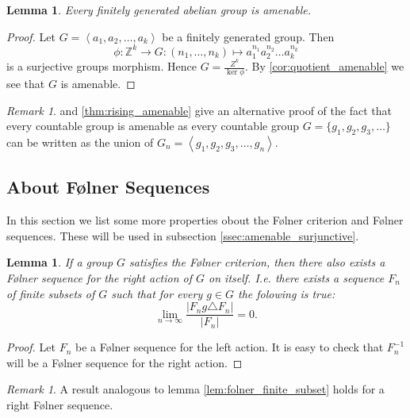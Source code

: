 \documentclass[titlepage, a4paper]{article}
\newcommand{\Z}{\mathbb{Z}}
\newcommand{\card}[1]{\left| #1 \right|}
\newtheorem{lemma}[theorem]{Lemma}
\theoremstyle{remark}
\newtheorem{remark}[theorem]{Remark}
\begin{document}
    \begin{lemma}\label{lem:fg_ab_amenable}
	    Every finitely generated abelian group is amenable.
    \end{lemma}
     \begin{proof}
	     Let $G = \left<a_1, a_2,\ldots, a_k \right>$ be a finitely generated group. Then \[
		     \phi: \Z^{k} \to G : (n_1, \ldots, n_k) \mapsto a_1^{n_1} a_2^{n_2} \ldots a_k^{n_k} 
	     \]
	     is a surjective groups morphism. Hence $G = \frac{Z^{k}}{\ker{\phi}}$. 
	     By \cref{cor:quotient_amenable} we see that $G$ is amenable.
	
    \end{proof}
    \begin{remark}
	     and \cref{thm:rising_amenable} give an alternative proof of the fact that every countable group is amenable as every countable group $G = \{g_1, g_2, g_3, \ldots\} $ can be written as the union of $G_n = \left<g_1, g_2, g_3, \ldots, g_n \right>$.
    \end{remark}


    \subsection{About Følner Sequences}  

In this section we list some more properties obout the Følner criterion and Følner sequences. These will be used in subsection \ref{ssec:amenable_surjunctive}.
\begin{lemma}\label{lem:right_folner_sequence}
	If a group $G$ satisfies the Følner criterion, then there also exists a Følner sequence for the right action of $G$ on itself. 
	I.e. there exists a sequence $F_n$ of finite subsets of $G$ such that 
		for every $g \in G$ the folowing is true: \[
				\lim_{n \to \infty} \frac{\card{F_ng \triangle F_n}}{\card{F_n}} = 0
		.\] 
\end{lemma}
\begin{proof}
	Let $F_n$ be a Følner sequence for the left action. 
	It is easy to check that $F_n^{-1}$ will be a Følner sequence for the right action. 
\end{proof}
\begin{remark}
    A result analogous to lemma \ref{lem:folner_finite_subset} holds for a right Følner sequence.
\end{remark}
\end{document}

